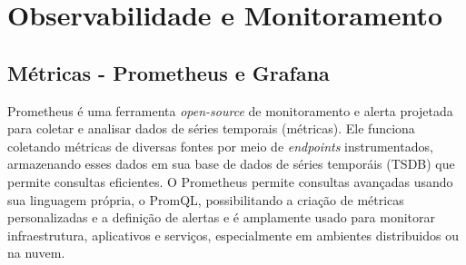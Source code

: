 







\section{Observabilidade e Monitoramento}

\subsection{Métricas - Prometheus e Grafana}
Prometheus é uma ferramenta \emph{open-source} de monitoramento e alerta projetada para coletar e analisar dados de séries temporais (métricas). Ele funciona coletando métricas de diversas fontes por meio de \emph{endpoints} instrumentados, armazenando esses dados em sua base de dados de séries temporáis (TSDB) que permite consultas eficientes. O Prometheus permite consultas avançadas usando sua linguagem própria, o PromQL, possibilitando a criação de métricas personalizadas e a definição de alertas e é amplamente usado para monitorar infraestrutura, aplicativos e serviços, especialmente em ambientes distribuidos ou na nuvem. \cite{prometheus-docs}

